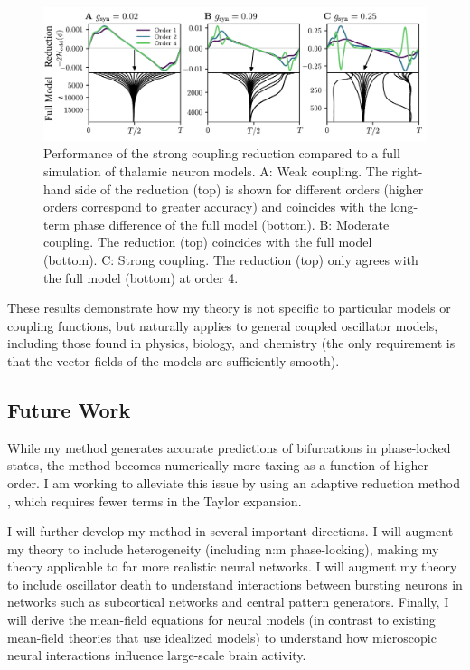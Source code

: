 \documentclass[a4paper,11pt]{article}
\begin{document}
	\begin{figure}[ht!]
		\centering
		\includegraphics[width=\textwidth]{figures/thal_h_edited.pdf}
		\caption{Performance of the strong coupling reduction compared to a full simulation of thalamic neuron models. A: Weak coupling. The right-hand side of the reduction (top) is shown for different orders (higher orders correspond to greater accuracy) and coincides with the long-term phase difference of the full model (bottom). B: Moderate coupling. The reduction (top) coincides with the full model (bottom). C: Strong coupling. The reduction (top) only agrees with the full model (bottom) at order 4. }\label{fig:thal}
	\end{figure}
	
	These results demonstrate how my theory is not specific to particular models or coupling functions, but naturally applies to general coupled oscillator models, including those found in physics, biology, and chemistry (the only requirement is that the vector fields of the models are sufficiently smooth).
	
	\subsection{Future Work}
	
	While my method generates accurate predictions of bifurcations in phase-locked states, the method becomes numerically more taxing as a function of higher order. I am working to alleviate this issue by using an adaptive reduction method \cite{wilson2020adaptive}, which requires fewer terms in the Taylor expansion.
    
    I will further develop my method in several important directions. I will augment my theory to include heterogeneity (including n:m phase-locking), making my theory applicable to far more realistic neural networks. I will augment my theory to include oscillator death to understand interactions between bursting neurons in networks such as subcortical networks and central pattern generators. Finally, I will derive the mean-field equations for neural models (in contrast to existing mean-field theories that use idealized models) to understand how microscopic neural interactions influence large-scale brain activity.
	
\end{document}
